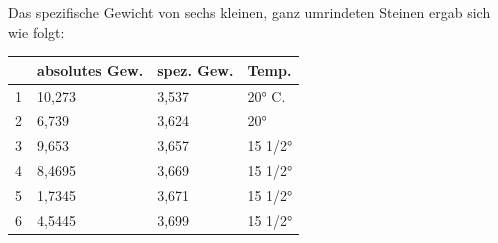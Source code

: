 \documentclass[a4paper, 11pt, oneside, german]{article}
\begin{document}
Das spezifische Gewicht von sechs kleinen, ganz umrindeten Steinen ergab sich wie folgt:
\begin{table}[H]
    \centering
    \begin{tabular}{|l|l|l|l|}
    \hline
        ~ & absolutes Gew. & spez. Gew. & Temp. \\ \hline
        1 & 10,273 & 3,537 & 20° C. \\ \hline
        2 & 6,739 & 3,624 & 20° \\ \hline
        3 & 9,653 & 3,657 & 15 1/2° \\ \hline
        4 & 8,4695 & 3,669 & 15 1/2° \\ \hline
        5 & 1,7345 & 3,671 & 15 1/2° \\ \hline
        6 & 4,5445 & 3,699 & 15 1/2° \\ \hline
    \end{tabular}
\end{table}
\end{document}
